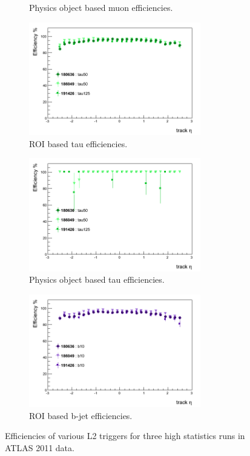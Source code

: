 \begin{figure}[htbp]
\begin{subfigure}{.5\linewidth}
		\caption{Physics object based muon efficiencies.}
		\label{fig:trig_2011_L2_eta_d}
	\end{subfigure}
	\begin{subfigure}{.5\linewidth}	
		\centering
		\includegraphics[width=75mm]{f/tau50_IDTrkNoCut_eta_SIT_eff}
		\caption{ROI based tau efficiencies.}
		\label{fig:trig_2011_L2_eta_e}
	\end{subfigure}
	\begin{subfigure}{.5\linewidth}	
		\centering
		\includegraphics[width=75mm]{f/tau50_IDTrkNoCut_eta_SIT_eff_comb}
		\caption{Physics object based tau efficiencies.}
		\label{fig:trig_2011_L2_eta_f}
	\end{subfigure}
	\begin{center}
	\begin{subfigure}{.5\linewidth}	
		\centering
		\includegraphics[width=75mm]{f/b10_IDTrkNoCut_eta_SIT_eff}
		\caption{ROI based b-jet efficiencies.}
		\label{fig:trig_2011_L2_eta_g}
	\end{subfigure}
	\end{center}
	\caption{Efficiencies of various L2 triggers for three high statistics runs in ATLAS 2011 data.}
	\label{fig:trig_2011_L2_eta}
\end{figure}

